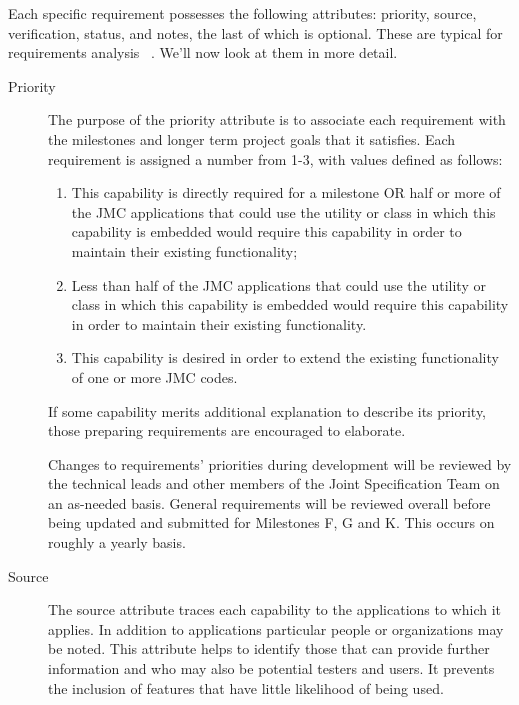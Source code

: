 Each specific requirement possesses the following attributes:  priority, 
source, verification, status, and notes, the last of which is optional.  
These are typical for requirements
analysis ~\cite{wiegers}.  We'll now look at them in more detail.

\begin{description}
\item [Priority] The purpose of the priority attribute is to associate
each requirement with the milestones and longer term project goals that 
it satisfies.  Each requirement is assigned a number from 1-3, with
values defined as follows:
\begin{enumerate}

\item This capability is directly required for a milestone OR
half or more of the JMC applications that could use the utility or class
in which this capability is embedded would require this
capability in order to maintain their existing functionality;
 
\item Less than half of the JMC applications that could use
the utility or class in which this capability is embedded 
would require this capability in order to maintain their existing
functionality.

\item This capability is desired in order to extend the existing 
functionality of one or more JMC codes.

\end{enumerate}

If some capability merits additional explanation to describe 
its priority, those preparing requirements are encouraged 
to elaborate.

Changes to requirements' priorities during development will be
reviewed by the technical leads and other members of the Joint
Specification Team on an as-needed basis.  General requirements 
will be reviewed overall before being updated and submitted for 
Milestones F, G and K.  This occurs on roughly a yearly basis.
 
\item [Source] The source attribute traces each capability
to the applications to which it applies.  In addition to applications
particular people or organizations may be noted.   This attribute 
helps to identify those that can provide further 
information and who may also be potential testers and users.  It
prevents the inclusion of features that have little likelihood of
being used.


\end{description}
